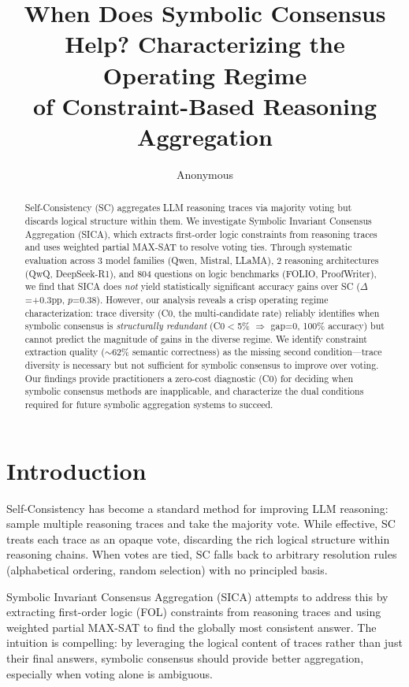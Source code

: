 \documentclass[11pt,a4paper]{article}
\title{When Does Symbolic Consensus Help? Characterizing the Operating Regime\\of Constraint-Based Reasoning Aggregation}
\author{Anonymous}
\begin{document}
\maketitle

\begin{abstract}
Self-Consistency (SC) aggregates LLM reasoning traces via majority voting but discards logical structure within them. We investigate Symbolic Invariant Consensus Aggregation (SICA), which extracts first-order logic constraints from reasoning traces and uses weighted partial MAX-SAT to resolve voting ties. Through systematic evaluation across 3 model families (Qwen, Mistral, LLaMA), 2 reasoning architectures (QwQ, DeepSeek-R1), and 804 questions on logic benchmarks (FOLIO, ProofWriter), we find that SICA does \emph{not} yield statistically significant accuracy gains over SC ($\Delta$=+0.3pp, $p$=0.38). However, our analysis reveals a crisp operating regime characterization: trace diversity (C0, the multi-candidate rate) reliably identifies when symbolic consensus is \emph{structurally redundant} (C0$<$5\% $\Rightarrow$ gap=0, 100\% accuracy) but cannot predict the magnitude of gains in the diverse regime. We identify constraint extraction quality ($\sim$62\% semantic correctness) as the missing second condition---trace diversity is necessary but not sufficient for symbolic consensus to improve over voting. Our findings provide practitioners a zero-cost diagnostic (C0) for deciding when symbolic consensus methods are inapplicable, and characterize the dual conditions required for future symbolic aggregation systems to succeed.
\end{abstract}

\section{Introduction}

Self-Consistency \cite{wang2023selfconsistency} has become a standard method for improving LLM reasoning: sample multiple reasoning traces and take the majority vote. While effective, SC treats each trace as an opaque vote, discarding the rich logical structure within reasoning chains. When votes are tied, SC falls back to arbitrary resolution rules (alphabetical ordering, random selection) with no principled basis.

Symbolic Invariant Consensus Aggregation (SICA) attempts to address this by extracting first-order logic (FOL) constraints from reasoning traces and using weighted partial MAX-SAT to find the globally most consistent answer. The intuition is compelling: by leveraging the logical content of traces rather than just their final answers, symbolic consensus should provide better aggregation, especially when voting alone is ambiguous.
\end{document}
